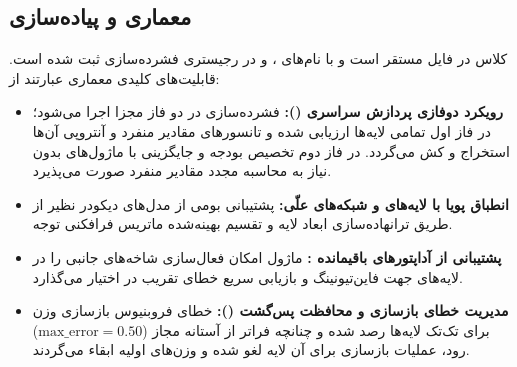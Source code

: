 \subsection{معماری و پیاده‌سازی}
کلاس  در فایل  مستقر است و با نام‌های ،  و  در رجیستری فشرده‌سازی ثبت شده است. قابلیت‌های کلیدی معماری عبارتند از:
\begin{itemize}
    \item \textbf{رویکرد دوفازی پردازش سراسری ():} فشرده‌سازی در دو فاز مجزا اجرا می‌شود؛ در فاز اول تمامی لایه‌ها ارزیابی شده و تانسورهای مقادیر منفرد و آنتروپی آن‌ها استخراج و کش می‌گردد. در فاز دوم تخصیص بودجه و جایگزینی با ماژول‌های  بدون نیاز به محاسبه مجدد مقادیر منفرد صورت می‌پذیرد.
    \item \textbf{انطباق پویا با لایه‌های  و شبکه‌های علّی:} پشتیبانی بومی از مدل‌های دیکودر نظیر  از طریق ترانهاده‌سازی ابعاد لایه  و تقسیم بهینه‌شده ماتریس فرافکنی توجه.
    \item \textbf{پشتیبانی از آداپتورهای باقیمانده :} ماژول امکان فعال‌سازی شاخه‌های  جانبی را در لایه‌های  جهت فاین‌تیونینگ و بازیابی سریع خطای تقریب در اختیار می‌گذارد.
    \item \textbf{مدیریت خطای بازسازی و محافظت پس‌گشت ():} خطای فروبنیوس بازسازی وزن برای تک‌تک لایه‌ها رصد شده و چنانچه فراتر از آستانه مجاز ($\text{max\_error}=0.50$) رود، عملیات بازسازی برای آن لایه لغو شده و وزن‌های اولیه ابقاء می‌گردند.
\end{itemize}
